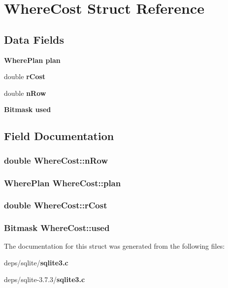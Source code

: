 \section{Where\-Cost Struct Reference}
\label{structWhereCost}
\subsection*{Data Fields}
\begin{CompactItemize}
\item 
\bf{Where\-Plan} \bf{plan}
\item 
double \bf{r\-Cost}
\item 
double \bf{n\-Row}
\item 
\bf{Bitmask} \bf{used}
\end{CompactItemize}


\subsection{Field Documentation}
\subsubsection{\setlength{\rightskip}{0pt plus 5cm}double \bf{Where\-Cost::n\-Row}}\label{structWhereCost_0634fb2cf95a8eac31e7b33951d467d1}


\subsubsection{\setlength{\rightskip}{0pt plus 5cm}\bf{Where\-Plan} \bf{Where\-Cost::plan}}\label{structWhereCost_953411c233b846cb3b4d6cd41c51fe59}


\subsubsection{\setlength{\rightskip}{0pt plus 5cm}double \bf{Where\-Cost::r\-Cost}}\label{structWhereCost_1b62f4b796d6204afe91da83070e58e0}


\subsubsection{\setlength{\rightskip}{0pt plus 5cm}\bf{Bitmask} \bf{Where\-Cost::used}}\label{structWhereCost_a6d5b871ed311d09c2822fb8734669b0}




The documentation for this struct was generated from the following files:\begin{CompactItemize}
\item 
deps/sqlite/\bf{sqlite3.c}\item 
deps/sqlite-3.7.3/\bf{sqlite3.c}\end{CompactItemize}

